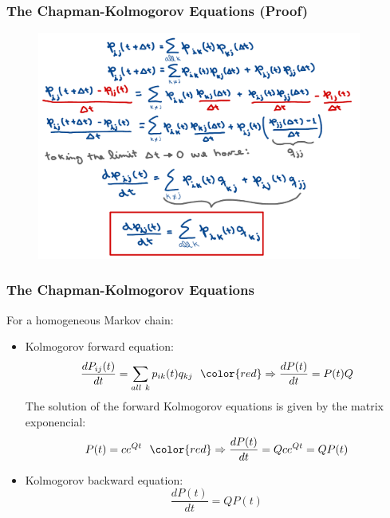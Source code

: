 \begin{frame}
    \frametitle{The Chapman-Kolmogorov Equations (Proof)}
        \begin{figure}
            \centering
            \includegraphics[width=0.95\textwidth]{slides/figures/ctmc_chapman_kolmogorov_proof.pdf}
        \end{figure}
\end{frame}

\begin{frame}
    \frametitle{The Chapman-Kolmogorov Equations}

        For a homogeneous Markov chain:

        \begin{itemize}
            \item Kolmogorov forward equation:
            $$\frac{dP_{ij}(t)}{dt} = \sum_{all~k}p_{ik}(t)q_{kj}~~{\color{red}\Rightarrow \frac{dP(t)}{dt}=P(t)Q}$$
            The solution of the forward Kolmogorov equations is given by the matrix exponencial:
            $$P(t) = ce^{Qt}~~{\color{red}\Rightarrow \frac{dP(t)}{dt} = Qce^{Qt} = QP(t)}$$
            \item Kolmogorov backward equation:
            $$\frac{dP(t)}{dt}=QP(t)$$
        \end{itemize}
\end{frame}


